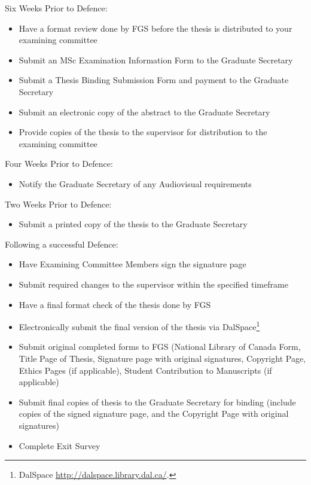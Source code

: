 \documentclass{article}
\newcommand\elink[1]{\url{#1}}
\begin{document}
Six Weeks Prior to Defence:
\begin{itemize}
\item Have a format review done by FGS before the thesis is distributed to your examining committee
\item Submit an MSc Examination Information Form to the Graduate Secretary
\item Submit a Thesis Binding Submission Form and payment to the Graduate Secretary
\item Submit an electronic copy of the abstract to the Graduate Secretary
\item Provide copies of the thesis to the supervisor for distribution to the examining committee
\end{itemize}

Four Weeks Prior to Defence:
\begin{itemize}
\item Notify the Graduate Secretary of any Audiovisual requirements
\end{itemize}

Two Weeks Prior to Defence:
\begin{itemize}
\item Submit a printed copy of the thesis to the Graduate Secretary
\end{itemize}

Following a successful Defence:

\begin{itemize}
\item Have Examining Committee Members sign the signature page
\item Submit required changes to the supervisor within the specified timeframe
\item Have a final format check of the thesis done by FGS

\item Electronically submit the final version of the thesis via
DalSpace\footnote{DalSpace \elink{http://dalspace.library.dal.ca/}.}



\item Submit original completed forms to FGS (National Library of Canada Form,
Title Page of Thesis, Signature page with original signatures, Copyright Page,
Ethics Pages (if applicable), Student Contribution to Manuscripts (if
applicable)

\item Submit final copies of thesis to the Graduate Secretary for binding
(include copies of the signed signature page, and the Copyright Page with
original signatures)

\item Complete Exit Survey
\end{itemize}
\end{document}
